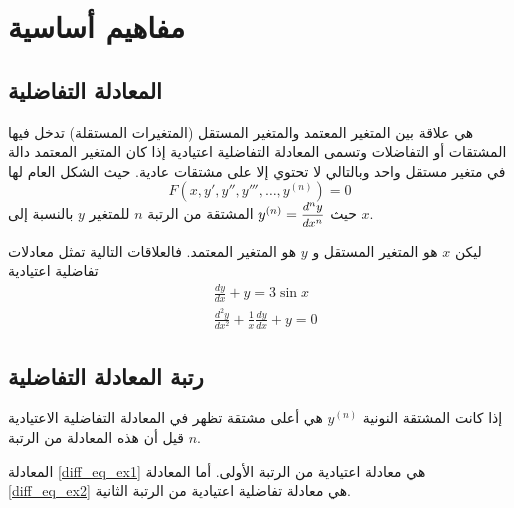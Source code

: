 \chapter{مفاهيم أساسية} 
\section[المعادلة التفاضلية]{المعادلة التفاضلية \cite{diff_eqs_sols_apps}}
    هي علاقة بين المتغير المعتمد والمتغير المستقل (المتغيرات المستقلة) تدخل فيها المشتقات أو التفاضلات وتسمى المعادلة التفاضلية اعتيادية إذا كان المتغير المعتمد دالة في متغير مستقل واحد وبالتالي لا تحتوي إلا على مشتقات عادية. حيث الشكل العام لها
\[
F(x,y',y'',y''',\dots,y^{(n)})=0
\]
حيث $y^{(n)}=\mfrac{d^ny}{dx^n}$ المشتقة من الرتبة $n$ للمتغير $y$ بالنسبة إلى $x$.

\begin{example}
    ليكن $x$ هو المتغير المستقل و $y$ هو المتغير المعتمد. فالعلاقات التالية تمثل معادلات تفاضلية اعتيادية
    \begin{align}
        &\frac{dy}{dx}+y=3\sin x\label{diff_eq_ex1}\\
        &\frac{d^2y}{dx^2}+\frac{1}{x}\frac{dy}{dx}+y=0\label{diff_eq_ex2}
    \end{align}
\end{example}

\section[رتبة المعادلة التفاضلية]{رتبة المعادلة التفاضلية \cite{diff_eqs_sols_apps}}
    إذا كانت المشتقة النونية $y^{(n)}$ هي أعلى مشتقة تظهر في المعادلة التفاضلية الاعتيادية قيل أن هذه المعادلة من الرتبة $n$.

\begin{example}
    المعادلة \eqref{diff_eq_ex1} هي معادلة اعتيادية من الرتبة الأولى. أما المعادلة \eqref{diff_eq_ex2} هي معادلة تفاضلية اعتيادية من الرتبة الثانية.
\end{example}

